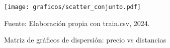         \begin{figure}[H]
            \caption{Matriz de gráficos de dispersión: precio vs distancias}
            \centering
            \texttt{[image: graficos/scatter\_conjunto.pdf]}
             \label{fig:barras}
            \begin{minipage}{7\textwidth}
            \footnotesize
            \hspace{2cm} Fuente: Elaboración propia con train.csv, 2024.
            \end{minipage}
            \label{fig:scatters}
        \end{figure}